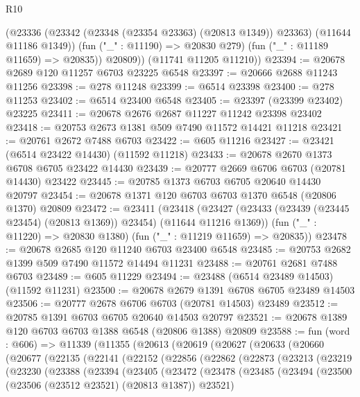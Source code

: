 \begin{lexlean}{R10}
\begin{coremodule}
            (@23336 (@23342 (@23348 (@23354 @23363) (@20813 @1349)) @23363) (@11644 @11186 @1349))
            (fun ("_" : @11190) => @20830 @279)
            (fun ("_" : @11189 @11659) => @20835))
          @20809))
      (@11741 @11205 @11210))
@23394 := @20678 @2689 @120 @11257 @6703 @23225 @6548
@23397 := @20666 @2688 @11243 @11256
@23398 := @278 @11248
@23399 := @6514 @23398
@23400 := @278 @11253
@23402 := @6514 @23400 @6548
@23405 := @23397 (@23399 @23402) @23225
@23411 := @20678 @2676 @2687 @11227 @11242 @23398 @23402
@23418 := @20753 @2673 @1381 @509 @7490 @11572 @14421 @11218
@23421 := @20761 @2672 @7488 @6703
@23422 := @605 @11216
@23427 := @23421 (@6514 @23422 @14430) (@11592 @11218)
@23433 := @20678 @2670 @1373 @6708 @6705 @23422 @14430
@23439 := @20777 @2669 @6706 @6703 (@20781 @14430) @23422
@23445 := @20785 @1373 @6703 @6705 @20640 @14430 @20797
@23454 := @20678 @1371 @120 @6703 @6703 @1370 @6548 (@20806 @1370) @20809
@23472 := @23411
    (@23418
      (@23427 (@23433 (@23439 (@23445 @23454) (@20813 @1369)) @23454) (@11644 @11216 @1369))
      (fun ("_" : @11220) => @20830 @1380)
      (fun ("_" : @11219 @11659) => @20835))
@23478 := @20678 @2685 @120 @11240 @6703 @23400 @6548
@23485 := @20753 @2682 @1399 @509 @7490 @11572 @14494 @11231
@23488 := @20761 @2681 @7488 @6703
@23489 := @605 @11229
@23494 := @23488 (@6514 @23489 @14503) (@11592 @11231)
@23500 := @20678 @2679 @1391 @6708 @6705 @23489 @14503
@23506 := @20777 @2678 @6706 @6703 (@20781 @14503) @23489
@23512 := @20785 @1391 @6703 @6705 @20640 @14503 @20797
@23521 := @20678 @1389 @120 @6703 @6703 @1388 @6548 (@20806 @1388) @20809
@23588 := fun (word : @606) =>
  @11339
    (@11355
      (@20613
        (@20619
          (@20627
            (@20633
              (@20660
                (@20677
                  (@22135
                    (@22141
                      (@22152
                        (@22856
                          (@22862
                            (@22873
                              (@23213
                                (@23219
                                  (@23230
                                    (@23388
                                      (@23394
                                        (@23405
                                          (@23472
                                            (@23478
                                              (@23485
                                                (@23494
                                                  (@23500
                                                    (@23506 (@23512 @23521) (@20813 @1387))
                                                    @23521)

\end{coremodule}
\end{lexlean}

